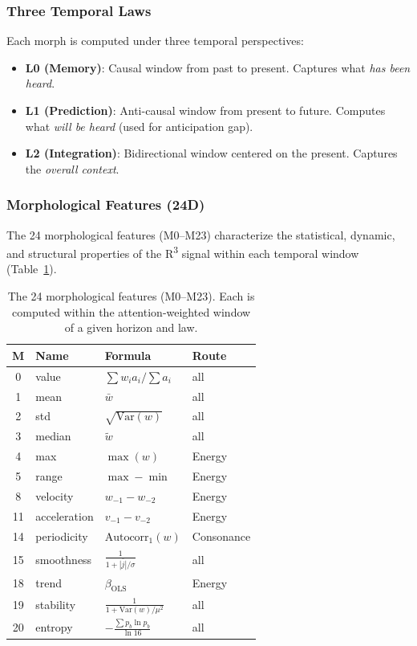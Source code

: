 \documentclass[10pt,twocolumn]{article}
\newcommand{\Rtri}{R\textsuperscript{3}}
\begin{document}
\subsubsection{Three Temporal Laws}

Each morph is computed under three temporal perspectives:

\begin{itemize}
\item \textbf{L0 (Memory)}: Causal window from past to present. Captures what \textit{has been heard}.
\item \textbf{L1 (Prediction)}: Anti-causal window from present to future. Computes what \textit{will be heard} (used for anticipation gap).
\item \textbf{L2 (Integration)}: Bidirectional window centered on the present. Captures the \textit{overall context}.
\end{itemize}

\subsubsection{Morphological Features (24D)}

The 24 morphological features (M0--M23) characterize the statistical, dynamic, and structural properties of the \Rtri{} signal within each temporal window (Table~\ref{tab:morphs}).

\begin{table}[t]
\centering
\caption{The 24 morphological features (M0--M23). Each is computed within the attention-weighted window of a given horizon and law.}
\label{tab:morphs}
\small
\begin{tabular}{@{}clll@{}}
\toprule
\textbf{M} & \textbf{Name} & \textbf{Formula} & \textbf{Route} \\
\midrule
0 & value & $\sum w_i a_i / \sum a_i$ & all \\
1 & mean  & $\bar{w}$ & all \\
2 & std   & $\sqrt{\text{Var}(w)}$ & all \\
3 & median & $\tilde{w}$ & all \\
4 & max   & $\max(w)$ & Energy \\
5 & range & $\max - \min$ & Energy \\
8 & velocity & $w_{-1} - w_{-2}$ & Energy \\
11 & acceleration & $v_{-1} - v_{-2}$ & Energy \\
14 & periodicity & $\text{Autocorr}_1(w)$ & Consonance \\
15 & smoothness & $\frac{1}{1+\bar{|j|}/\sigma}$ & all \\
18 & trend & $\beta_\text{OLS}$ & Energy \\
19 & stability & $\frac{1}{1+\text{Var}(w)/\mu^2}$ & all \\
20 & entropy & $-\frac{\sum p_b \ln p_b}{\ln 16}$ & all \\
\bottomrule
\end{tabular}
\end{table}
\end{document}
